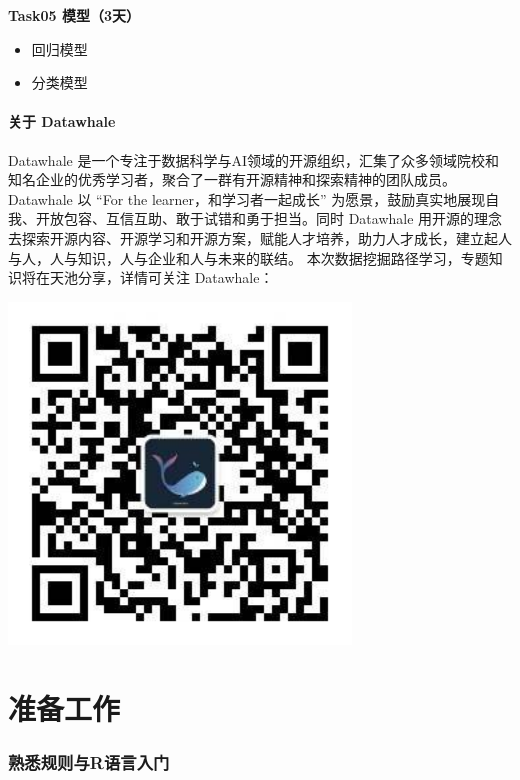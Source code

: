 \documentclass[]{ctexbook}
\providecommand{\tightlist}{%
  \setlength{\itemsep}{0pt}\setlength{\parskip}{0pt}}
\begin{document}
\textbf{Task05 模型（3天）}

\begin{itemize}
\tightlist
\item
  回归模型
\item
  分类模型
\end{itemize}

\hypertarget{ux5173ux4e8e-datawhale}{%
\subsection*{关于 Datawhale}\label{ux5173ux4e8e-datawhale}}


Datawhale 是一个专注于数据科学与AI领域的开源组织，汇集了众多领域院校和知名企业的优秀学习者，聚合了一群有开源精神和探索精神的团队成员。Datawhale 以 ``For the learner，和学习者一起成长'' 为愿景，鼓励真实地展现自我、开放包容、互信互助、敢于试错和勇于担当。同时 Datawhale 用开源的理念去探索开源内容、开源学习和开源方案，赋能人才培养，助力人才成长，建立起人与人，人与知识，人与企业和人与未来的联结。 本次数据挖掘路径学习，专题知识将在天池分享，详情可关注 Datawhale：

\includegraphics[width=3.58in]{image/logo}

\hypertarget{part-ux51c6ux5907ux5de5ux4f5c}{%
\part{准备工作}\label{part-ux51c6ux5907ux5de5ux4f5c}}

\hypertarget{task-00}{%
\section*{熟悉规则与R语言入门}\label{task-00}}
\end{document}
